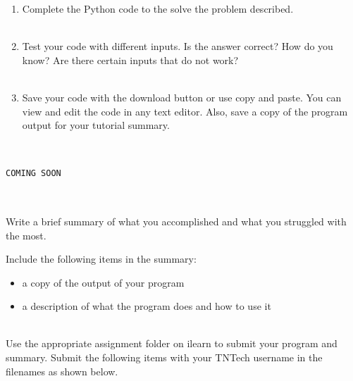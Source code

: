 \documentclass[12pt]{article}
\begin{document}
\begin{description}[labelindent=1cm]
\begin{enumerate}
		\item Complete the Python code to the solve the problem described. \\\\
		
		\item Test your code with different inputs. Is the answer correct? How do you know? Are there certain inputs that do not work? \\\\
		
		\item Save your code with the download button or use copy and paste. You can view and edit the code in any text editor. Also, save a copy of the program output for your tutorial summary. \\\\

	\end{enumerate}

\newpage
\item[\textbf{\underline{Solution Code:}}] \hfill \vspace{0mm}

\begin{lstlisting}

COMING SOON
	
\end{lstlisting}

\item[\textbf{\underline{Tutorial Summary:}}] \hfill \vspace{3mm}\\ 
Write a brief summary of what you accomplished and what you struggled with the most. 

Include the following items in the summary:
\begin{itemize}

\item a copy of the output of your program
\item a description of what the program does and how to use it

\end{itemize}


\item[\textbf{\underline{Submission on Teams:}}] \hfill \vspace{3mm}\\ 
Use the appropriate assignment folder on ilearn to submit your program and summary. Submit the following items with your TNTech username in the filenames as shown below. \vspace{0mm}\\


\end{description}
\end{document}
